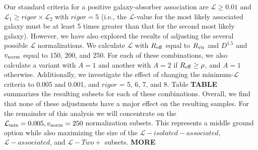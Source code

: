 \documentclass[twocolumn,tighten]{aastex62}
\begin{document}
Our standard criteria for a positive galaxy-absorber association are $\mathcal{L} \geq 0.01$ and $\mathcal{L}_1 \geq rigor \times \mathcal{L}_2$ with $rigor =5$ (i.e., the $\mathcal{L}$-value for the most likely associated galaxy must be at least 5 times greater than that for the second most likely galaxy). However, we have also explored the results of adjusting the several possible $\mathcal{L}$ normalizations. We calculate $\mathcal{L}$ with $R_{\rm eff}$ equal to $R_{\rm vir}$ and $D^{1.5}$ and $v_{\rm norm}$ equal to 150, 200, and 250. For each of these combinations, we also calculate a variant with $A =1$ and another with $A = 2$ if $R_{\rm eff} \ge \rho$, and $A=1$ otherwise. Additionally, we investigate the effect of changing the minimum-$\mathcal{L}$ criteria to 0.005 and 0.001, and $rigor$ = 5, 6, 7, and 8. Table \textbf{TABLE} summarizes the resulting subsets for each of these combinations. Overall, we find that none of these adjustments have a major effect on the resulting samples. For the remainder of this analysis we will concentrate on the $\mathcal{L}_{\rm min} = 0.005, v_{\rm norm} = 250$ normalization subsets. This represents a middle ground option while also maximizing the size of the $\mathcal{L}-isolated-associated$, $\mathcal{L}-associated$, and $\mathcal{L}-Two+$ subsets. \textbf{MORE}


\end{document}

